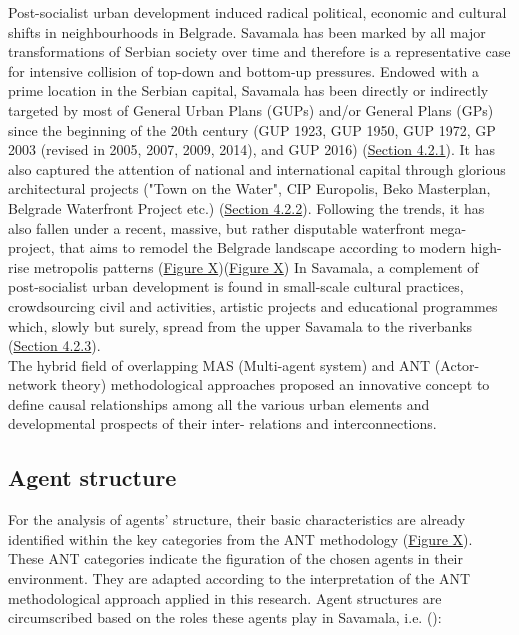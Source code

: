 \documentclass[11pt]{report}
\begin{document}
{{{{Post-socialist urban development induced radical political, economic and cultural shifts in neighbourhoods in Belgrade. Savamala has been marked by all major transformations of Serbian society over time and therefore is a representative case for intensive collision of top-down and bottom-up pressures.
Endowed with a prime location in the Serbian capital, Savamala has been directly or indirectly targeted by most of General Urban Plans (GUPs) and/or General Plans (GPs) since the beginning of the 20th century (GUP 1923, GUP 1950, GUP 1972, GP 2003 (revised in 2005, 2007, 2009, 2014), and GUP 2016) (\href{Section 4.2.1}{Section 4.2.1}).
It has also captured the attention of national and international capital through glorious architectural projects ("Town on the Water", CIP Europolis, Beko Masterplan, Belgrade Waterfront Project etc.) (\href{Section 4.2.2}{Section 4.2.2}).
Following the trends, it has also fallen under a recent, massive, but rather disputable waterfront mega-project, that aims to remodel the Belgrade landscape according to modern high-rise metropolis patterns (\href{FigureX}{Figure X})(\href{FigureX}{Figure X})
In Savamala, a complement of post-socialist urban development is found in small-scale cultural practices, crowdsourcing civil and  activities, artistic projects and educational programmes which, slowly but surely, spread from the upper Savamala to the riverbanks (\href{Section 4.2.3}{Section 4.2.3}).
\\

The hybrid field of overlapping MAS (Multi-agent system) and ANT (Actor-network theory) methodological approaches proposed an innovative concept to define causal relationships among all the various urban elements and developmental prospects of their inter- relations and interconnections.

\subsection{Agent structure}

For the analysis of agents' structure, their basic characteristics are already identified within the key categories from the ANT methodology (\href{FigureX}{Figure X}).
These ANT categories indicate the figuration of the chosen agents in their environment. They are adapted according to the interpretation of the ANT methodological approach applied in this research.
Agent structures are circumscribed based on the roles these agents play in Savamala, i.e. (\href{Cvetinovic}{\citealt{Cvetinovic_participatory_2016}}): %

}}}}
\end{document}
